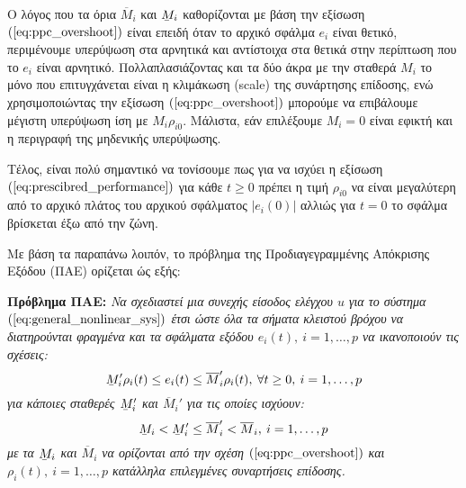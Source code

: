 Ο λόγος που τα όρια $\overline{M}_i$ και $\barbelow{M}_i$ καθορίζονται με βάση την εξίσωση $(\ref{eq:ppc_overshoot})$ είναι επειδή όταν το αρχικό σφάλμα $e_i$ είναι θετικό, περιμένουμε υπερύψωση στα αρνητικά και αντίστοιχα στα θετικά στην περίπτωση που το $e_i$ είναι αρνητικό. Πολλαπλασιάζοντας και τα δύο άκρα με την σταθερά $M_i$ το μόνο που επιτυγχάνεται είναι η κλιμάκωση (scale) της συνάρτησης επίδοσης, ενώ χρησιμοποιώντας την εξίσωση $(\ref{eq:ppc_overshoot})$ μπορούμε να επιβάλουμε μέγιστη υπερύψωση ίση με $M_i \rho_{i0}$. Μάλιστα, εάν επιλέξουμε $M_i = 0$ είναι εφικτή και η περιγραφή της μηδενικής υπερύψωσης.

Τέλος, είναι πολύ σημαντικό να τονίσουμε πως για να ισχύει η εξίσωση $(\ref{eq:prescibred_performance})$ για κάθε $t \geq 0$ πρέπει η τιμή $\rho_{i0}$ να είναι μεγαλύτερη από το αρχικό πλάτος του αρχικού σφάλματος $| e_{i}(0) |$ αλλιώς για $t = 0$ το σφάλμα βρίσκεται έξω από την ζώνη.

Με βάση τα παραπάνω λοιπόν, το πρόβλημα της Προδιαγεγραμμένης Απόκρισης Εξόδου (ΠΑΕ) ορίζεται ώς εξής: 
\pagebreak


\textbf{Πρόβλημα ΠΑΕ:}
\textit{ Να σχεδιαστεί μια συνεχής είσοδος ελέγχου $u$ για το σύστημα $(\ref{eq:general_nonlinear_sys})$ έτσι ώστε όλα τα σήματα κλειστού βρόχου να διατηρούνται φραγμένα και τα σφάλματα εξόδου $e_i(t), \: i = 1,\dots ,p$ να ικανοποιούν τις σχέσεις:
\begin{equation}
	\barbelow{M}_i' \rho_i(t) \leq e_i(t) \leq \overline{M}_i'  \rho_i(t),
	\: \forall t \geq 0, \: i = 1,\dots ,p
	\label{eq:ppc_problem_definition}
\end{equation}
για κάποιες σταθερές $\barbelow{M}_i'$ και $\overline{M}_i'$ για τις οποίες ισχύουν:
\begin{equation*}
	\barbelow{M}_i < \barbelow{M}_i' \leq \overline{M}_i' < \overline{M}_i, \: i = 1,\dots ,p
\end{equation*}
με τα $\barbelow{M}_i$ και $\overline{M}_i$ να ορίζονται από την σχέση $(\ref{eq:ppc_overshoot})$ και $\rho_i(t), \: i = 1,\dots ,p$ κατάλληλα επιλεγμένες συναρτήσεις επίδοσης.
}

